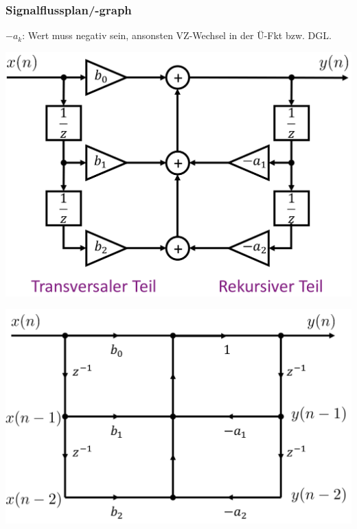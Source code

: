 \subsubsection{Signalflussplan/-graph}
$-a_k$: Wert muss negativ sein, ansonsten VZ-Wechsel in der Ü-Fkt bzw. DGL.\\
\begin{minipage}{0.4\columnwidth}
	\includegraphics[width=\columnwidth]{Bilder/Signalfluss_plan-graph}
\end{minipage}
\begin{minipage}{0.5\columnwidth}
\includegraphics[width=\columnwidth]{Bilder/Signalflussdiagramm}
\end{minipage}


